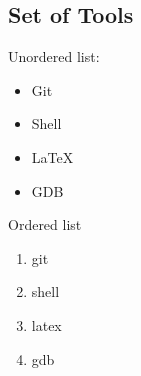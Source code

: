 \documentclass{article}
\begin{document}
\subsection{Set of Tools}
Unordered list:
\begin{itemize}
	\item Git
	\item Shell
	\item LaTeX
	\item GDB
\end{itemize}

Ordered list
\begin{enumerate}
	\item git
	\item shell
	\item latex
	\item gdb
\end{enumerate}
\end{document}
